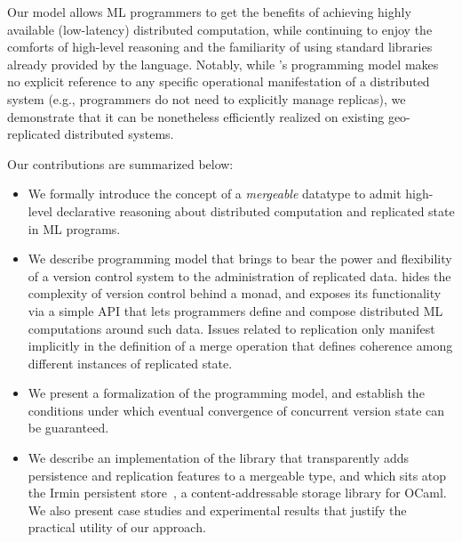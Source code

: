 Our model allows ML programmers to get the benefits of achieving
highly available (low-latency) distributed computation, while
continuing to enjoy the comforts of high-level reasoning and the
familiarity of using standard libraries already provided by the
language.  Notably, while \name's programming model makes no explicit
reference to any specific operational manifestation of a distributed
system (e.g., programmers do not need to explicitly manage replicas),
we demonstrate that it can be nonetheless efficiently realized on
existing geo-replicated distributed systems.

Our contributions are summarized below:

\begin{itemize}
    \item We formally introduce the concept of a \emph{mergeable}
      datatype to admit high-level declarative reasoning about
      distributed computation and replicated state in ML programs.

    \item We describe \name programming model that brings to bear the
      power and flexibility of a version control system to the
      administration of replicated data. \name hides the complexity of
      version control behind a monad, and exposes its functionality
      via a simple API that lets programmers define and compose
      distributed ML computations around such data.  Issues related to
      replication only manifest implicitly in the definition of a
      merge operation that defines coherence among different instances
      of replicated state.

    \item We present a formalization of the \name programming model,
      and establish the conditions under which eventual convergence of
      concurrent version state can be guaranteed.

    \item We describe an implementation of the \name library that
      transparently adds persistence and replication features to a
      mergeable type, and which sits atop the Irmin persistent
      store~\cite{irmin}, a content-addressable storage library for
      OCaml. We also present case studies and experimental results
      that justify the practical utility of our approach.
\end{itemize}

